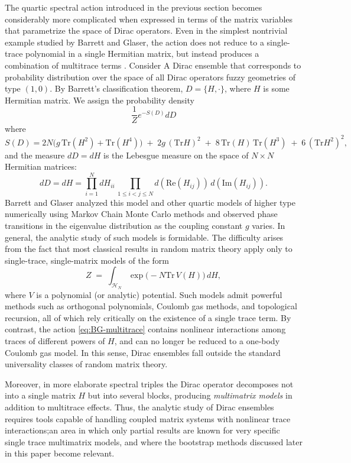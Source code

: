 \documentclass[11pt]{article}
\theoremstyle{plain}
\begin{document}
The quartic spectral action introduced in the previous section becomes considerably more
complicated when expressed in terms of the matrix variables that parametrize the space of Dirac operators.
Even in the simplest nontrivial example studied by Barrett and Glaser, the action does not reduce to a
single-trace polynomial in a single Hermitian matrix, but instead produces a combination of multitrace
terms \cite{Sanchez spectral action}. Consider A Dirac ensemble that corresponds to probability distribution over the space of all Dirac operators fuzzy geometries of type $(1,0)$. By Barrett's classification theorem, $D = \{H,\cdot\}$, where $H$ is some Hermitian matrix. We assign the probability density 
\begin{equation*}
	\frac{1}{Z}e^{-S(D)}dD
\end{equation*}
where 
\begin{equation}
\label{eq:BG-multitrace}
S(D)
  = 2N\bigl(g\, \mathrm{Tr}(H^2) + \mathrm{Tr}(H^4)\bigr)
    \;+\; 2g\, (\mathrm{Tr} H)^2
    \;+\; 8\,\mathrm{Tr}(H)\,\mathrm{Tr}(H^3)
    \;+\; 6\,(\mathrm{Tr} H^2)^2,
\end{equation}
and the measure $dD=dH$ is the Lebesgue measure on the space of $N \times N$ Hermitian matrices:
\begin{equation*}
	d D = d H = \prod_{i=1}^N d H_{ii} \, \prod_{1 \leq i < j \leq N}  d ({\text{Re}} (H_{ij})) \, d ({\text{Im}} (H_{ij})). 
\end{equation*}
Barrett and Glaser analyzed this model and other quartic models of higher type numerically using Markov Chain Monte Carlo methods and observed
phase transitions in the eigenvalue distribution as the coupling constant \(g\) varies. In general, the analytic study of such models is formidable. The difficulty arises from the fact that most classical results in random matrix theory apply only to
single-trace, single-matrix models of the form
\[
Z \;=\; \int_{\mathcal{H}_N} \exp\!\bigl( -N \mathrm{Tr} \, V(H) \bigr)\, dH,
\]
where \(V\) is a polynomial (or analytic) potential. Such models admit powerful methods such as
orthogonal polynomials, Coulomb gas methods, and topological recursion, all of which rely critically on the
existence of a single trace term. By contrast, the action \eqref{eq:BG-multitrace} contains nonlinear
interactions among traces of different powers of \(H\), and can no longer be reduced to a one-body
Coulomb gas model. In this sense, Dirac ensembles fall outside the standard universality classes of
random matrix theory.

Moreover, in more elaborate spectral triples the Dirac operator decomposes not into a single matrix
\(H\) but into several blocks, producing \emph{multimatrix models} in addition to multitrace effects.
Thus, the analytic study of Dirac ensembles requires tools capable of handling coupled matrix systems
with nonlinear trace interactions;an area in which only partial results are known for very specific single trace multimatrix models, and where the
bootstrap methods discussed later in this paper become relevant.
\end{document}
